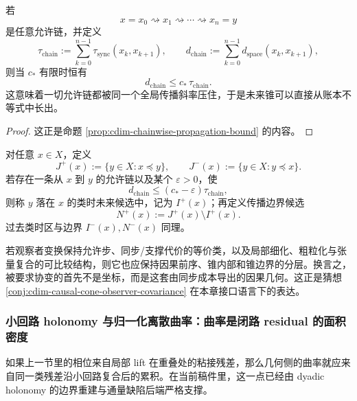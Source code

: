\begin{proposition}[链式传播上界]\label{prop:typed-address-biaxial-completion-chainwise-propagation-bound}
若
\[
x=x_0\rightsquigarrow x_1\rightsquigarrow\cdots\rightsquigarrow x_n=y
\]
是任意允许链，并定义
\[
\tau_{\mathrm{chain}}
:=
\sum_{k=0}^{n-1}\tau_{\mathrm{sync}}(x_k,x_{k+1}),
\qquad
d_{\mathrm{chain}}
:=
\sum_{k=0}^{n-1}d_{\mathrm{space}}(x_k,x_{k+1}),
\]
则当 \(c_*\) 有限时恒有
\[
d_{\mathrm{chain}}\le c_*\,\tau_{\mathrm{chain}}.
\]
这意味着一切允许链都被同一个全局传播斜率压住，于是未来锥可以直接从账本不等式中长出。
\end{proposition}
\begin{proof}
这正是命题 \ref{prop:cdim-chainwise-propagation-bound} 的内容。
\end{proof}

\begin{definition}\label{def:typed-address-biaxial-completion-causal-cones}
对任意 \(x\in X\)，定义
\[
J^+(x):=\{y\in X:x\preceq y\},
\qquad
J^-(x):=\{y\in X:y\preceq x\}.
\]
若存在一条从 \(x\) 到 \(y\) 的允许链以及某个 \(\varepsilon>0\)，使
\[
d_{\mathrm{chain}}\le (c_*-\varepsilon)\tau_{\mathrm{chain}},
\]
则称 \(y\) 落在 \(x\) 的类时未来候选中，记为 \(I^+(x)\)；再定义传播边界候选
\[
N^+(x):=J^+(x)\setminus I^+(x).
\]
过去类时区与边界 \(I^-(x),N^-(x)\) 同理。
\end{definition}

\begin{conjecture}[传播锥的观察者协变性]\label{conj:typed-address-biaxial-completion-observer-covariance}
若观察者变换保持允许步、同步/支撑代价的等价类，以及局部细化、粗粒化与张量复合的可比较结构，则它也应保持因果前序、锥内部和锥边界的分层。换言之，被要求协变的首先不是坐标，而是这套由同步成本导出的因果几何。这正是猜想 \ref{conj:cdim-causal-cone-observer-covariance} 在本章接口语言下的表达。
\end{conjecture}

\subsubsection{小回路 holonomy 与归一化离散曲率：曲率是闭路 residual 的面积密度}\label{subsubsec:typed-address-biaxial-completion-holonomy-curvature}
如果上一节里的相位来自局部 lift 在重叠处的粘接残差，那么几何侧的曲率就应来自同一类残差沿小回路复合后的累积。在当前稿件里，这一点已经由 dyadic holonomy 的边界重建与通量缺陷后端严格支撑。

